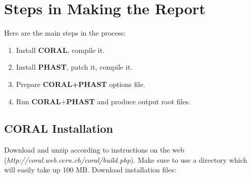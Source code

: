 \documentclass[a4paper,12pt]{article}
\begin{document}
\section{Steps in Making the Report}

Here are the main steps in the process:

\begin{enumerate}
\item Install {\bf CORAL}, compile it. 
\item Install {\bf PHAST}, patch it, compile it.
\item Prepare {\bf CORAL+PHAST} options file.
\item Run {\bf CORAL}+{\bf PHAST} and produce output root files.
\end{enumerate}

\subsection{{\bf CORAL} Installation}
Download and unzip according to instructions on the web ({\it http://coral.web.cern.ch/coral/build.php}). Make sure to use a directory which will easily take up 100 MB. Download installation files:
\end{document}
